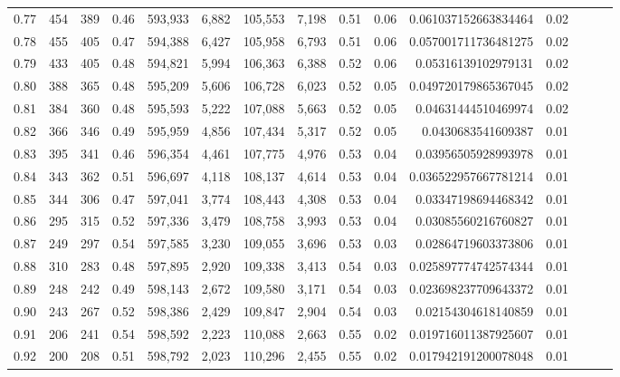 \begin{tabular}{rrrrrrrrrrrrrrr}
0.77 &     454 &    389 &  0.46 &  593,933 &    6,882 &  105,553 &    7,198 &  0.51 &  0.06 &  0.061037152663834464 &      0.02 \\
0.78 &     455 &    405 &  0.47 &  594,388 &    6,427 &  105,958 &    6,793 &  0.51 &  0.06 &  0.057001711736481275 &      0.02 \\
0.79 &     433 &    405 &  0.48 &  594,821 &    5,994 &  106,363 &    6,388 &  0.52 &  0.06 &   0.05316139102979131 &      0.02 \\
0.80 &     388 &    365 &  0.48 &  595,209 &    5,606 &  106,728 &    6,023 &  0.52 &  0.05 &  0.049720179865367045 &      0.02 \\
0.81 &     384 &    360 &  0.48 &  595,593 &    5,222 &  107,088 &    5,663 &  0.52 &  0.05 &   0.04631444510469974 &      0.02 \\
0.82 &     366 &    346 &  0.49 &  595,959 &    4,856 &  107,434 &    5,317 &  0.52 &  0.05 &    0.0430683541609387 &      0.01 \\
0.83 &     395 &    341 &  0.46 &  596,354 &    4,461 &  107,775 &    4,976 &  0.53 &  0.04 &   0.03956505928993978 &      0.01 \\
0.84 &     343 &    362 &  0.51 &  596,697 &    4,118 &  108,137 &    4,614 &  0.53 &  0.04 &  0.036522957667781214 &      0.01 \\
0.85 &     344 &    306 &  0.47 &  597,041 &    3,774 &  108,443 &    4,308 &  0.53 &  0.04 &   0.03347198694468342 &      0.01 \\
0.86 &     295 &    315 &  0.52 &  597,336 &    3,479 &  108,758 &    3,993 &  0.53 &  0.04 &   0.03085560216760827 &      0.01 \\
0.87 &     249 &    297 &  0.54 &  597,585 &    3,230 &  109,055 &    3,696 &  0.53 &  0.03 &   0.02864719603373806 &      0.01 \\
0.88 &     310 &    283 &  0.48 &  597,895 &    2,920 &  109,338 &    3,413 &  0.54 &  0.03 &  0.025897774742574344 &      0.01 \\
0.89 &     248 &    242 &  0.49 &  598,143 &    2,672 &  109,580 &    3,171 &  0.54 &  0.03 &  0.023698237709643372 &      0.01 \\
0.90 &     243 &    267 &  0.52 &  598,386 &    2,429 &  109,847 &    2,904 &  0.54 &  0.03 &   0.02154304618140859 &      0.01 \\
0.91 &     206 &    241 &  0.54 &  598,592 &    2,223 &  110,088 &    2,663 &  0.55 &  0.02 &  0.019716011387925607 &      0.01 \\
0.92 &     200 &    208 &  0.51 &  598,792 &    2,023 &  110,296 &    2,455 &  0.55 &  0.02 &  0.017942191200078048 &      0.01 \\

\end{tabular}
